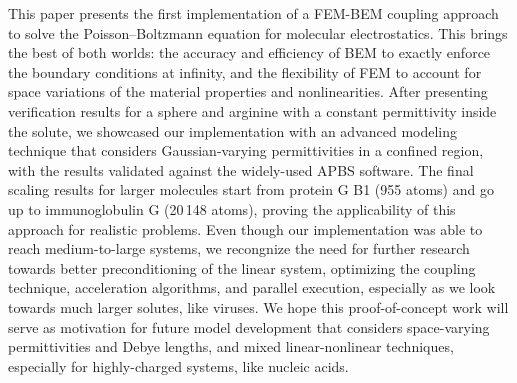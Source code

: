 This paper presents the first implementation of a FEM-BEM coupling approach to solve the Poisson--Boltzmann equation for molecular electrostatics. This brings the best of both worlds: the accuracy and efficiency of BEM to exactly enforce the boundary conditions at infinity, and the flexibility of FEM to account for space variations of the material properties and nonlinearities. After presenting verification results for a sphere and arginine with a constant permittivity inside the solute, we showcased our implementation with an advanced modeling technique that considers Gaussian-varying permittivities in a confined region, with the results validated against the widely-used APBS software. The final scaling results for larger molecules start from protein G B1 (955 atoms) and go up to immunoglobulin G (20\,148 atoms), proving the applicability of this approach for realistic problems. Even though our implementation was able to reach medium-to-large systems, we recongnize the need for further research towards better preconditioning of the linear system, optimizing the coupling technique, acceleration algorithms, and parallel execution, especially as we look towards much larger solutes, like viruses. We hope this proof-of-concept work will serve as motivation for future model development that considers space-varying permittivities and Debye lengths, and mixed linear-nonlinear techniques, especially for highly-charged systems, like nucleic acids. 
